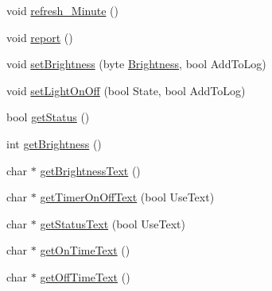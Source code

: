 \begin{DoxyCompactItemize}
\item 
void \hyperlink{class_lights_a38c74606e1c2b4ff7db184920b225961}{refresh\+\_\+\+Minute} ()
\item 
void \hyperlink{class_lights_a68fc62af07d71db2fb5a436e11ecad3c}{report} ()
\item 
void \hyperlink{class_lights_a94b8cac76cd536d361b9b634511ac371}{set\+Brightness} (byte \hyperlink{class_lights_ac5fa7d7fdfb9a051a63dde55b67925fe}{Brightness}, bool Add\+To\+Log)
\item 
void \hyperlink{class_lights_ab18f05b043b61b6eb74bd7b564e1a1ec}{set\+Light\+On\+Off} (bool State, bool Add\+To\+Log)
\item 
bool \hyperlink{class_lights_a240cc60cfb0f2b94b1cd9e8a9202b7ee}{get\+Status} ()
\item 
int \hyperlink{class_lights_aea8e88f2668fbcc2d3e36dcfe51fbfa5}{get\+Brightness} ()
\item 
char $\ast$ \hyperlink{class_lights_a4bb15ec318f4b6e5f2c12d6c6df73caa}{get\+Brightness\+Text} ()
\item 
char $\ast$ \hyperlink{class_lights_a912d1b2e51274277f2b70a8667d6bd6b}{get\+Timer\+On\+Off\+Text} (bool Use\+Text)
\item 
char $\ast$ \hyperlink{class_lights_a1091d64a103a8356b03f8b080d256054}{get\+Status\+Text} (bool Use\+Text)
\item 
char $\ast$ \hyperlink{class_lights_ae797ac0b4b64b1f0264508160bf7f5b3}{get\+On\+Time\+Text} ()
\item 
char $\ast$ \hyperlink{class_lights_a03976471c6435ee329690da54224360b}{get\+Off\+Time\+Text} ()
\end{DoxyCompactItemize}

